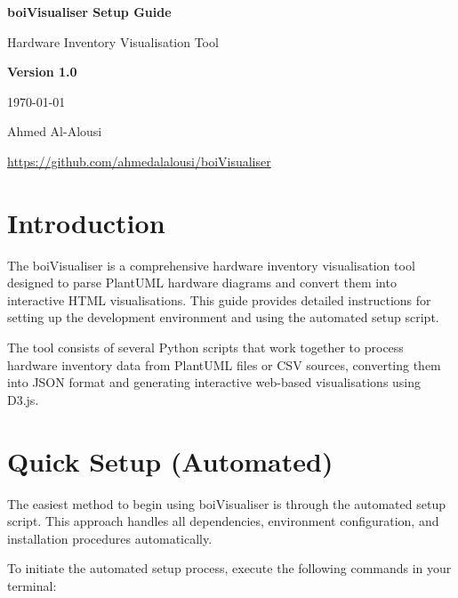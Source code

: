 \documentclass[11pt,a4paper]{article}
\begin{document}
\begin{titlepage}
\centering
\vspace*{2cm}

{\Huge\bfseries boiVisualiser Setup Guide\par}
\vspace{1cm}
{\Large Hardware Inventory Visualisation Tool\par}
\vspace{2cm}

{\large\textbf{Version 1.0}\par}
\vspace{0.5cm}
{\large\today\par}

\vfill

{\large Ahmed Al-Alousi\par}
\vspace{0.5cm}
{\normalsize\url{https://github.com/ahmedalalousi/boiVisualiser}\par}

\end{titlepage}

\tableofcontents
\newpage

\section{Introduction}

The boiVisualiser is a comprehensive hardware inventory visualisation tool designed to parse PlantUML hardware diagrams and convert them into interactive HTML visualisations. This guide provides detailed instructions for setting up the development environment and using the automated setup script.

The tool consists of several Python scripts that work together to process hardware inventory data from PlantUML files or CSV sources, converting them into JSON format and generating interactive web-based visualisations using D3.js.

\section{Quick Setup (Automated)}

The easiest method to begin using boiVisualiser is through the automated setup script. This approach handles all dependencies, environment configuration, and installation procedures automatically.

To initiate the automated setup process, execute the following commands in your terminal:
\end{document}
